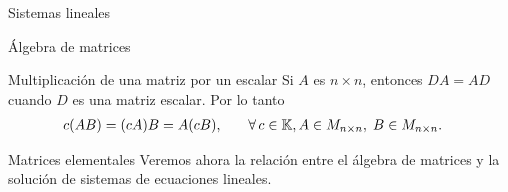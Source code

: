 \begin{chapter}{Sistemas lineales}
\begin{section}{\'Algebra de matrices}
\begin{subsection}{Multiplicaci\'on de una matriz por un escalar}
            Si $A$ es $n \times n$,  entonces $DA = AD$ cuando $D$  es una matriz escalar. Por lo tanto
            \begin{align*}
            c(A B) = (cA) B = A(cB),\qquad &\forall\, c \in \mathbb K,  A \in M_{n \times n}, \;B \in M_{n \times n}.
            \end{align*} 

        \end{subsection}
            
            
        \end{section}
        
        \begin{section}{Matrices elementales}\label{seccion-matrices-elementales}
            Veremos ahora la relación entre el álgebra de matrices y la solución de sistemas de ecuaciones lineales. 
            

\end{section}
\end{chapter}
